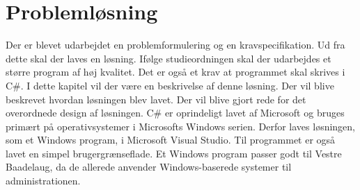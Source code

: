 \chapter{Problemløsning}
\label{cha:problemlosning}

Der er blevet udarbejdet en problemformulering og en kravspecifikation. Ud fra dette skal der laves en løsning. Ifølge studieordningen skal der udarbejdes et større program af høj kvalitet. Det er også et krav at programmet skal skrives i C\#. I dette kapitel vil der være en beskrivelse af denne løsning. Der vil blive beskrevet hvordan løsningen blev lavet. Der vil blive gjort rede for det overordnede design af løsningen. C\# er oprindeligt lavet af Microsoft og bruges primært på operativsystemer i Microsofts Windows serien. Derfor laves løsningen, som et Windows program, i Microsoft Visual Studio. Til programmet er også lavet en simpel brugergrænseflade. Et Windows program passer godt til Vestre Baadelaug, da de allerede anvender Windows-baserede systemer til administrationen.

